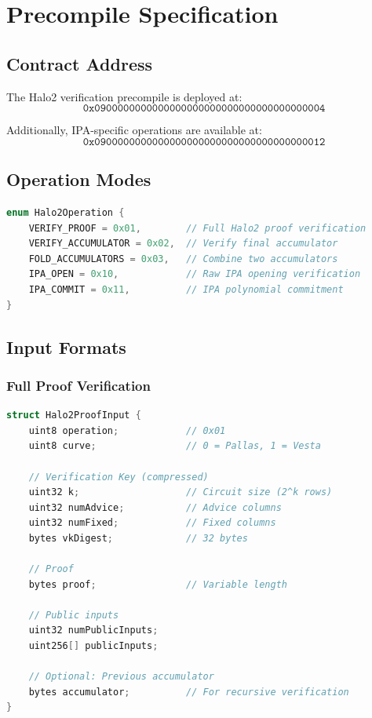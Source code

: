 \documentclass[11pt,a4paper]{article}
\theoremstyle{definition}
\begin{document}
\section{Precompile Specification}

\subsection{Contract Address}

The Halo2 verification precompile is deployed at:
\[
\texttt{0x0900000000000000000000000000000000000004}
\]

Additionally, IPA-specific operations are available at:
\[
\texttt{0x0900000000000000000000000000000000000012}
\]

\subsection{Operation Modes}

\begin{lstlisting}[language=C]
enum Halo2Operation {
    VERIFY_PROOF = 0x01,        // Full Halo2 proof verification
    VERIFY_ACCUMULATOR = 0x02,  // Verify final accumulator
    FOLD_ACCUMULATORS = 0x03,   // Combine two accumulators
    IPA_OPEN = 0x10,            // Raw IPA opening verification
    IPA_COMMIT = 0x11,          // IPA polynomial commitment
}
\end{lstlisting}

\subsection{Input Formats}

\subsubsection{Full Proof Verification}

\begin{lstlisting}[language=C]
struct Halo2ProofInput {
    uint8 operation;            // 0x01
    uint8 curve;                // 0 = Pallas, 1 = Vesta

    // Verification Key (compressed)
    uint32 k;                   // Circuit size (2^k rows)
    uint32 numAdvice;           // Advice columns
    uint32 numFixed;            // Fixed columns
    bytes vkDigest;             // 32 bytes

    // Proof
    bytes proof;                // Variable length

    // Public inputs
    uint32 numPublicInputs;
    uint256[] publicInputs;

    // Optional: Previous accumulator
    bytes accumulator;          // For recursive verification
}
\end{lstlisting}
\end{document}
